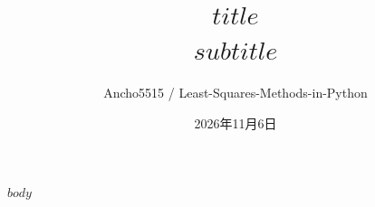 \documentclass[UTF8,a4paper,11pt,oneside,openany]{ctexbook}
\title{\Huge $title$\\[1em]\Large $subtitle$}
\author{Ancho5515 / Least-Squares-Methods-in-Python}
\date{2026年11月6日}
\begin{document}
\frontmatter
\maketitle
\tableofcontents
\mainmatter
$body$
\end{document}

